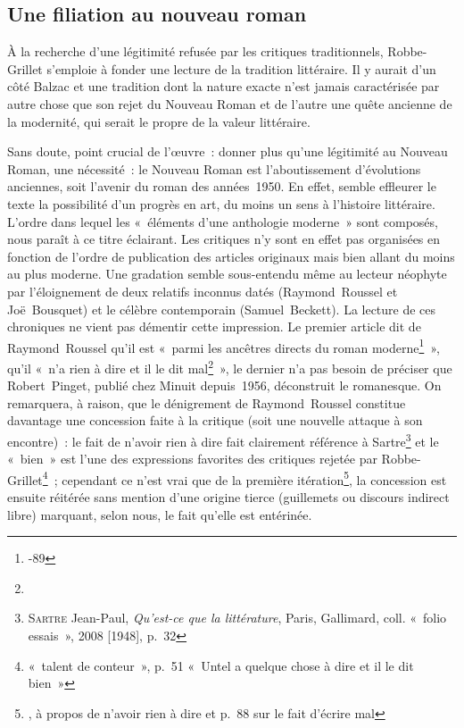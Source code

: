 \documentclass[12pt, a4paper]{article}
\begin{document}
\subsection{Une filiation au nouveau roman}
\label{filiation}
À la recherche d'une légitimité refusée par les critiques traditionnels, Robbe-Grillet s'emploie à fonder une lecture de la tradition littéraire. Il y aurait d'un côté Balzac et une tradition dont la nature exacte n'est jamais caractérisée par autre chose que son rejet du Nouveau Roman et de l'autre une quête ancienne de la modernité, qui serait le propre de la valeur littéraire.




Sans doute, point crucial de l'œuvre~: donner plus qu'une légitimité au Nouveau Roman, une nécessité~: le Nouveau Roman est l'aboutissement d'évolutions anciennes, soit l'avenir du roman des années~1950. En effet, semble effleurer le texte la possibilité d'un progrès en art, du moins un sens à l'histoire littéraire.
L'ordre dans lequel les «~éléments d'une anthologie moderne~» sont composés, nous paraît à ce titre éclairant. Les critiques n'y sont en effet pas organisées en fonction de l'ordre de publication des articles originaux mais bien allant du moins au plus moderne. Une gradation semble sous-entendu même au lecteur néophyte par l'éloignement de deux relatifs inconnus datés (Raymond~Roussel et Joë~Bousquet) et le célèbre contemporain (Samuel~Beckett). La lecture de ces chroniques ne vient pas démentir cette impression. Le premier article dit de Raymond~Roussel qu'il est «~parmi les ancêtres directs du roman moderne\footnote{-89}~», qu'il «~n’a rien à dire et il le dit mal\footnote{}~», le dernier n'a pas besoin de préciser que Robert~Pinget, publié chez Minuit depuis~1956, déconstruit le romanesque. On remarquera, à raison, que le dénigrement de Raymond~Roussel constitue davantage une concession faite à la critique (soit une nouvelle attaque à son encontre)~: le fait de n'avoir rien à dire fait clairement référence à Sartre\footnote{\textsc{Sartre} Jean-Paul, \textit{Qu'est-ce que la littérature}, Paris, Gallimard, coll. «~folio essais~», 2008 [1948], p.~32} et le «~bien~» est l'une des expressions favorites des critiques rejetée par Robbe-Grillet\footnote{ «~talent de conteur~», p.~51 «~Untel a quelque chose à dire et il le dit bien~»}~; cependant ce n'est vrai que de la première itération\footnote{, à propos de n'avoir rien à dire et p.~88 sur le fait d'écrire mal}, la concession est ensuite réitérée sans mention d'une origine tierce (guillemets ou discours indirect libre) marquant, selon nous, le fait qu'elle est entérinée.
\end{document}
